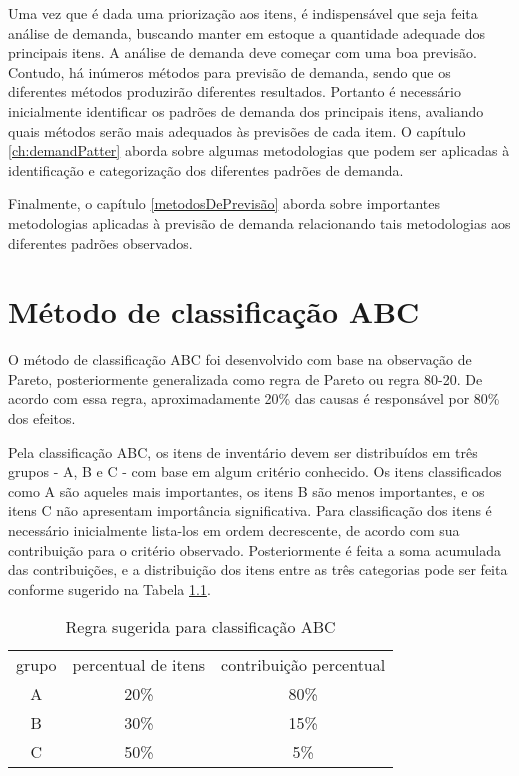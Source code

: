 \documentclass{book}
\begin{document}
Uma vez que é dada uma priorização aos itens, é indispensável que seja feita análise de demanda, buscando manter em estoque a quantidade adequade dos principais itens. A análise de demanda deve começar com uma boa previsão. Contudo, há inúmeros métodos para previsão de demanda, sendo que os diferentes métodos produzirão diferentes resultados. Portanto é necessário inicialmente identificar os padrões de demanda dos principais itens, avaliando quais métodos serão mais adequados às previsões de cada item. O capítulo \ref{ch:demandPatter} aborda sobre algumas metodologias que podem ser aplicadas à identificação e categorização dos diferentes padrões de demanda.

Finalmente, o capítulo \ref{metodosDePrevisão} aborda sobre importantes metodologias aplicadas à previsão de demanda relacionando tais metodologias aos diferentes padrões observados.

\chapter{Método de classificação ABC}
\label{ch:ABC}

O método de classificação ABC foi desenvolvido com base na observação de Pareto, posteriormente generalizada como regra de Pareto ou regra 80-20. De acordo com essa regra, aproximadamente 20\% das causas é responsável por 80\% dos efeitos.

Pela classificação ABC, os itens de inventário devem ser distribuídos em três grupos - A, B e C - com base em algum critério conhecido. Os itens classificados como A são aqueles mais importantes, os itens B são menos importantes, e os itens C não apresentam importância significativa. Para classificação dos itens é necessário inicialmente lista-los em ordem decrescente, de acordo com sua contribuição para o critério observado. Posteriormente é feita a soma acumulada das contribuições, e a distribuição dos itens entre as três categorias pode ser feita conforme sugerido na Tabela \ref{tab:ABCRules}. \\

\begin{table}[h]
\begin{center}
\begin{tabular}[c]{c c c}
\cline {1-3}
grupo & percentual de itens & contribuição percentual \\ \cline {1-3}
A & 20\% &  80\%   \\ 
B & 30\% &  15\%   \\
C & 50\% &  5\% \\ 
\cline {1-3}
\end{tabular}
\caption{Regra sugerida para classificação ABC}
\label{tab:ABCRules}
\end{center}
\end{table}
\end{document}
